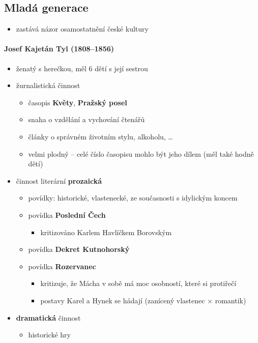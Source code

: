 \subsection{Mladá generace}
\begin{itemize}
\item zastává názor osamostatnění české kultury
\end{itemize}

\paragraph{Josef Kajetán Tyl (1808--1856)}
\begin{itemize}
\item ženatý s herečkou, měl 6 dětí s její sestrou
\item žurnalistická činnost
	\begin{itemize}
	\item časopis \textbf{Květy}, \textbf{Pražský posel}
	\item snaha o vzdělání a vychování čtenářů
	\item články o správném životním stylu, alkoholu, \ldots
	\item velmi plodný -- celé číslo časopisu mohlo být jeho dílem (měl také hodně dětí)
	\end{itemize}
\item činnost literární \textbf{prozaická}
	\begin{itemize}
	\item povídky: historické, vlastenecké, ze současnosti s idylickým koncem
	\item povídka \textbf{Poslední Čech}
		\begin{itemize}
		\item kritizováno Karlem Havlíčkem Borovským
		\end{itemize}
	\item povídka \textbf{Dekret Kutnohorský}
	\item povídka \textbf{Rozervanec}
		\begin{itemize}
		\item kritizuje, že Mácha v sobě má moc osobností, které si protiřečí 
		\item postavy Karel a Hynek se hádají (zanícený vlastenec $\times$ romantik)
		\end{itemize}
	\end{itemize}
\item \textbf{dramatická} činnost
	\begin{itemize}
	\item historické hry

\end{itemize}
\end{itemize}
